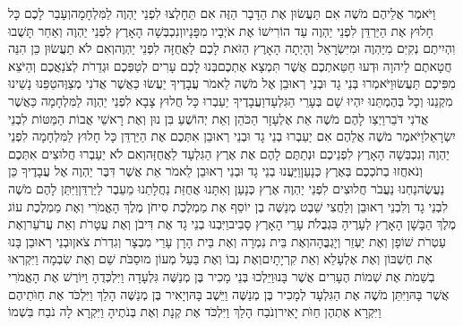 \documentclass[../main/main.tex]{subfiles}
\begin{document}
\begin{multicols}{\ncols}
וַיֹּאמֶר אֲלֵיהֶם מֹשֶׁה אִם תַּעֲשׂוּן אֶת הַדָּבָר הַזֶּה אִם תֵּחָלְצוּ לִפְנֵי יַהְוֶה לַמִּלְחָמָה\PreVerseSpace{}וְעָבַר לָכֶם כָּל חָלוּץ אֶת הַיַּרְדֵּן לִפְנֵי יַהְוֶה עַד הוֹרִישׁוֹ אֶת אֹיְבָיו מִפָּנָיו\PreVerseSpace{}וְנִכְבְּשָׁה הָאָרֶץ לִפְנֵי יַהְוֶה וְאַחַר תָּשֻׁבוּ וִהְיִיתֶם נְקִיִּם מִיַּהְוֶה וּמִיִּשְׂרָאֵל וְהָיְתָה הָאָרֶץ הַזֹּאת לָכֶם לַאֲחֻזָּה לִפְנֵי יַהְוֶה\PreVerseSpace{}וְאִם לֹא תַעֲשׂוּן כֵּן הִנֵּה חֲטָאתֶם לַיהוָה וּדְעוּ חַטַּאתְכֶם אֲשֶׁר תִּמְצָא אֶתְכֶם\PreVerseSpace{}בְּנוּ לָכֶם עָרִים לְטַפְּכֶם וּגְדֵרֹת לְצֹנַאֲכֶם וְהַיֹּצֵא מִפִּיכֶם תַּעֲשׂוּ\PreVerseSpace{}וַיֹּאמְרוּ\SubEnd{} בְּנֵי גָד וּבְנֵי רְאוּבֵן אֶל מֹשֶׁה לֵאמֹר עֲבָדֶיךָ יַעֲשׂוּ כַּאֲשֶׁר אֲדֹנִי מְצַוֶּה\PreVerseSpace{}טַפֵּנוּ נָשֵׁינוּ מִקְנֵנוּ וְכָל בְּהֶמְתֵּנוּ יִהְיוּ שָׁם בְּעָרֵי הַגִּלְעָד\PreVerseSpace{}וַעֲבָדֶיךָ יַעַבְרוּ כָּל חֲלוּץ צָבָא לִפְנֵי יַהְוֶה לַמִּלְחָמָה כַּאֲשֶׁר אֲדֹנִי דֹּבֵר\PreVerseSpace{}וַיְצַו לָהֶם מֹשֶׁה אֵת אֶלְעָזָר הַכֹּהֵן וְאֵת יְהוֹשֻׁעַ בִּן נוּן וְאֶת רָאשֵׁי אֲבוֹת הַמַּטּוֹת לִבְנֵי יִשְׂרָאֵל\PreVerseSpace{}וַיֹּאמֶר מֹשֶׁה אֲלֵהֶם אִם יַעַבְרוּ בְנֵי גָד וּבְנֵי רְאוּבֵן אִתְּכֶם אֶת הַיַּרְדֵּן כָּל חָלוּץ לַמִּלְחָמָה לִפְנֵי יַהְוֶה וְנִכְבְּשָׁה הָאָרֶץ לִפְנֵיכֶם וּנְתַתֶּם לָהֶם אֶת אֶרֶץ הַגִּלְעָד לַאֲחֻזָּה\PreVerseSpace{}וְאִם לֹא יַעַבְרוּ חֲלוּצִים אִתְּכֶם וְנֹאחֲזוּ בְתֹכְכֶם בְּאֶרֶץ כְּנָעַן\PreVerseSpace{}וַיַּעֲנוּ בְנֵי גָד וּבְנֵי רְאוּבֵן לֵאמֹר אֵת אֲשֶׁר דִּבֶּר יַהְוֶה אֶל עֲבָדֶיךָ כֵּן נַעֲשֶׂה\PreVerseSpace{}נַחְנוּ נַעֲבֹר חֲלוּצִים לִפְנֵי יַהְוֶה אֶרֶץ כְּנָעַן וְאִתָּנוּ אֲחֻזַּת נַחֲלָתֵנוּ מֵעֵבֶר לַיַּרְדֵּן\PreVerseSpace{}וַיִּתֵּן לָהֶם מֹשֶׁה לִבְנֵי גָד וְלִבְנֵי רְאוּבֵן וְלַחֲצִי שֵׁבֶט מְנַשֶּׁה בֶן יוֹסֵף אֶת מַמְלֶכֶת סִיחֹן מֶלֶךְ הָאֱמֹרִי וְאֶת מַמְלֶכֶת עוֹג מֶלֶךְ הַבָּשָׁן הָאָרֶץ לְעָרֶיהָ בִּגְבֻלֹת עָרֵי הָאָרֶץ סָבִיב\PreVerseSpace{}וַיִּבְנוּ בְנֵי גָד אֶת דִּיבֹן וְאֶת עֲטָרֹת וְאֵת עֲרֹעֵר\PreVerseSpace{}וְאֶת עַטְרֹת שׁוֹפָן וְאֶת יַעְזֵר וְיָגְבֳּהָה\PreVerseSpace{}וְאֶת בֵּית נִמְרָה וְאֶת בֵּית הָרָן עָרֵי מִבְצָר וְגִדְרֹת צֹאן\PreVerseSpace{}וּבְנֵי רְאוּבֵן בָּנוּ אֶת חֶשְׁבּוֹן וְאֶת אֶלְעָלֵא וְאֵת קִרְיָתָיִם\PreVerseSpace{}וְאֶת נְבוֹ וְאֶת בַּעַל מְעוֹן מוּסַבֹּת שֵׁם וְאֶת שִׂבְמָה וַיִּקְרְאוּ בְשֵׁמֹת אֶת שְׁמוֹת הֶעָרִים אֲשֶׁר בָּנוּ\PreVerseSpace{}וַיֵּלְכוּ בְּנֵי מָכִיר בֶּן מְנַשֶּׁה גִּלְעָדָה וַיִּלְכְּדֻהָ וַיּוֹרֶשׁ אֶת הָאֱמֹרִי אֲשֶׁר בָּהּ\PreVerseSpace{}וַיִּתֵּן מֹשֶׁה אֶת הַגִּלְעָד לְמָכִיר בֶּן מְנַשֶּׁה וַיֵּשֶׁב בָּהּ\PreVerseSpace{}וְיָאִיר בֶּן מְנַשֶּׁה הָלַךְ וַיִּלְכֹּד אֶת חַוֺּתֵיהֶם וַיִּקְרָא אֶתְהֶן חַוֺּת יָאִיר\PreVerseSpace{}וְנֹבַח הָלַךְ וַיִּלְכֹּד אֶת קְנָת וְאֶת בְּנֹתֶיהָ וַיִּקְרָא לָה נֹבַח בִּשְׁמוֹ\OpenSection{}\par

\end{multicols}
\end{document}
